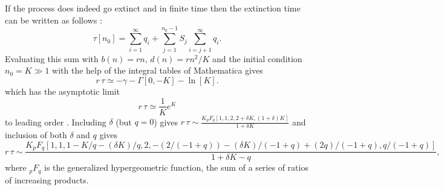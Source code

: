 If the process does indeed go extinct and in finite time then the extinction time can be written as follows \cite{Nisbet1982}:
\begin{equation}%
\tau[n_0] = \sum_{i=1}^{\infty}q_i + \sum_{j=1}^{n_0-1} S_j\sum_{i=j+1}^{\infty}q_i.
\end{equation}
Evaluating this sum with $b(n)=r n$, $d(n)=rn^2/K$ and the initial condition $n_0 = K \gg 1$ with the help of the integral tables of Mathematica gives
\begin{equation*}
r\,\tau \simeq -\gamma - \Gamma[0,-K] - \ln[K].
\end{equation*}
which has the asymptotic limit
\begin{equation}%
r\,\tau \simeq \frac{1}{K}e^K
\label{1Dlog-appendix}
\end{equation}
to leading order \cite{Lande1993}.
Including $\delta$ (but $q=0$) gives
$r\,\tau \sim \frac{K {}_pF_q[{1, 1}, {2, 2 + \delta K}, (1 + \delta) K]}{1 + \delta K}$
and inclusion of both $\delta$ and $q$ gives
\begin{equation}
r\,\tau \sim \frac{K {}_pF_q[{1, 1, 1 - K/q - (\delta K)/q}, {2, -(2/(-1 + q)) - (\delta K)/(-1 + q) + (2 q)/(-1 + q)}, q/(-1 + q)]}{1 + \delta K - q},
\end{equation}
where ${}_pF_q$ is the generalized hypergeometric function, the sum of a series of ratios of increasing products. 


